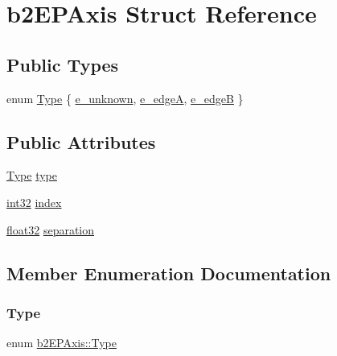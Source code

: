 \hypertarget{structb2_e_p_axis}{}\section{b2\+E\+P\+Axis Struct Reference}
\label{structb2_e_p_axis}
\subsection*{Public Types}
\begin{DoxyCompactItemize}
\item 
enum \mbox{\hyperlink{structb2_e_p_axis_a1a2feab0d321a5cd20677c92cbfd6f3c}{Type}} \{ \mbox{\hyperlink{structb2_e_p_axis_a1a2feab0d321a5cd20677c92cbfd6f3ca2cf59d3f4d868c658be76d9b6db990c5}{e\+\_\+unknown}}, 
\mbox{\hyperlink{structb2_e_p_axis_a1a2feab0d321a5cd20677c92cbfd6f3ca3fdfed075f4e7a74f3b0a409f60bc18d}{e\+\_\+edgeA}}, 
\mbox{\hyperlink{structb2_e_p_axis_a1a2feab0d321a5cd20677c92cbfd6f3ca294ec203285ac3dc63b68c67b3ce67e9}{e\+\_\+edgeB}}
 \}
\end{DoxyCompactItemize}
\subsection*{Public Attributes}
\begin{DoxyCompactItemize}
\item 
\mbox{\hyperlink{structb2_e_p_axis_a1a2feab0d321a5cd20677c92cbfd6f3c}{Type}} \mbox{\hyperlink{structb2_e_p_axis_a336d3ba4b4ed020a1f6c4c0f70098e39}{type}}
\item 
\mbox{\hyperlink{b2_settings_8h_a43d43196463bde49cb067f5c20ab8481}{int32}} \mbox{\hyperlink{structb2_e_p_axis_a8e530d411d98e7ab8112c4022f5f65e4}{index}}
\item 
\mbox{\hyperlink{b2_settings_8h_aacdc525d6f7bddb3ae95d5c311bd06a1}{float32}} \mbox{\hyperlink{structb2_e_p_axis_acfd60cfd1f1ad4c448bd0260117ef6fc}{separation}}
\end{DoxyCompactItemize}


\subsection{Member Enumeration Documentation}
\mbox{\label{structb2_e_p_axis_a1a2feab0d321a5cd20677c92cbfd6f3c}} 
\subsubsection{\texorpdfstring{Type}{Type}}
{\footnotesize\ttfamily enum \mbox{\hyperlink{structb2_e_p_axis_a1a2feab0d321a5cd20677c92cbfd6f3c}{b2\+E\+P\+Axis\+::\+Type}}}

